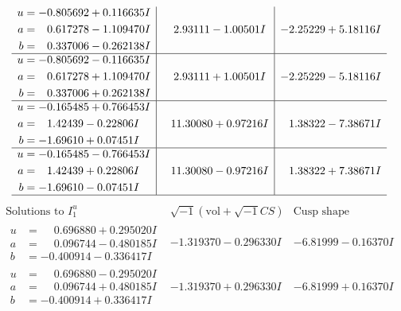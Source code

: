 \documentclass[1p]{elsarticle_modified}
\theoremstyle{definition}
\newcommand{\I}{\sqrt{-1}}
\begin{document}
$$\begin{array}{c|c|c}
\begin{aligned}
u &= -0.805692 + 0.116635 I \\
a &= \phantom{-}0.617278 - 1.109470 I \\
b &= \phantom{-}0.337006 - 0.262138 I\end{aligned}
 & \phantom{-}2.93111 - 1.00501 I & -2.25229 + 5.18116 I \\ \hline\begin{aligned}
u &= -0.805692 - 0.116635 I \\
a &= \phantom{-}0.617278 + 1.109470 I \\
b &= \phantom{-}0.337006 + 0.262138 I\end{aligned}
 & \phantom{-}2.93111 + 1.00501 I & -2.25229 - 5.18116 I \\ \hline\begin{aligned}
u &= -0.165485 + 0.766453 I \\
a &= \phantom{-}1.42439 - 0.22806 I \\
b &= -1.69610 + 0.07451 I\end{aligned}
 & \phantom{-}11.30080 + 0.97216 I & \phantom{-}1.38322 - 7.38671 I \\ \hline\begin{aligned}
u &= -0.165485 - 0.766453 I \\
a &= \phantom{-}1.42439 + 0.22806 I \\
b &= -1.69610 - 0.07451 I\end{aligned}
 & \phantom{-}11.30080 - 0.97216 I & \phantom{-}1.38322 + 7.38671 I\\
 \hline 
 \end{array}$$\newpage$$\begin{array}{c|c|c}  
\text{Solutions to }I^u_{1}& \I (\text{vol} + \sqrt{-1}CS) & \text{Cusp shape}\\
 \hline 
\begin{aligned}
u &= \phantom{-}0.696880 + 0.295020 I \\
a &= \phantom{-}0.096744 - 0.480185 I \\
b &= -0.400914 - 0.336417 I\end{aligned}
 & -1.319370 - 0.296330 I & -6.81999 - 0.16370 I \\ \hline\begin{aligned}
u &= \phantom{-}0.696880 - 0.295020 I \\
a &= \phantom{-}0.096744 + 0.480185 I \\
b &= -0.400914 + 0.336417 I\end{aligned}
 & -1.319370 + 0.296330 I & -6.81999 + 0.16370 I \\ \hline\begin{aligned}

\end{aligned}
\end{array}$$
\end{document}
